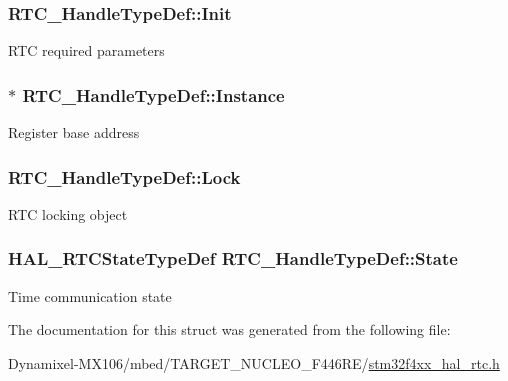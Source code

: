 \subsubsection[{\texorpdfstring{Init}{Init}}]{ R\+T\+C\+\_\+\+Handle\+Type\+Def\+::\+Init}\hypertarget{struct_r_t_c___handle_type_def_ad8d1ab770e21b2ff3da405115c5933a7}{}\label{struct_r_t_c___handle_type_def_ad8d1ab770e21b2ff3da405115c5933a7}
R\+TC required parameters 
\subsubsection[{\texorpdfstring{Instance}{Instance}}]{$\ast$ R\+T\+C\+\_\+\+Handle\+Type\+Def\+::\+Instance}\hypertarget{struct_r_t_c___handle_type_def_a6a7bc50c975a169d24ba0a174f260abc}{}\label{struct_r_t_c___handle_type_def_a6a7bc50c975a169d24ba0a174f260abc}
Register base address 
\subsubsection[{\texorpdfstring{Lock}{Lock}}]{ R\+T\+C\+\_\+\+Handle\+Type\+Def\+::\+Lock}\hypertarget{struct_r_t_c___handle_type_def_ae72730d37db2c70485236bb9ff400592}{}\label{struct_r_t_c___handle_type_def_ae72730d37db2c70485236bb9ff400592}
R\+TC locking object 
\subsubsection[{\texorpdfstring{State}{State}}]{ {\bf H\+A\+L\+\_\+\+R\+T\+C\+State\+Type\+Def} R\+T\+C\+\_\+\+Handle\+Type\+Def\+::\+State}\hypertarget{struct_r_t_c___handle_type_def_ae6f4d8c6cf47f2bd0823d5b570e44774}{}\label{struct_r_t_c___handle_type_def_ae6f4d8c6cf47f2bd0823d5b570e44774}
Time communication state 

The documentation for this struct was generated from the following file\+:\begin{DoxyCompactItemize}
\item 
Dynamixel-\/\+M\+X106/mbed/\+T\+A\+R\+G\+E\+T\+\_\+\+N\+U\+C\+L\+E\+O\+\_\+\+F446\+R\+E/\hyperlink{stm32f4xx__hal__rtc_8h}{stm32f4xx\+\_\+hal\+\_\+rtc.\+h}\end{DoxyCompactItemize}
